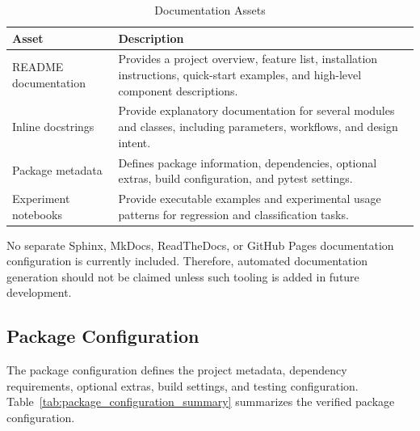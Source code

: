 \begin{table}[H]
      \centering
      \caption{Documentation Assets}
      \label{tab:documentation_assets}
      \renewcommand{\arraystretch}{1.2}
      \begin{tabularx}{\textwidth}{
                  >{\raggedright\arraybackslash}p{3.8cm}
                  >{\raggedright\arraybackslash}X
            }
            \toprule
            \textbf{Asset}       & \textbf{Description}                                                                                        \\
            \midrule
            README documentation &
            Provides a project overview, feature list, installation instructions, quick-start examples, and high-level component descriptions. \\

            Inline docstrings    &
            Provide explanatory documentation for several modules and classes, including parameters, workflows, and design intent.             \\

            Package metadata     &
            Defines package information, dependencies, optional extras, build configuration, and pytest settings.                              \\

            Experiment notebooks &
            Provide executable examples and experimental usage patterns for regression and classification tasks.                               \\
            \bottomrule
      \end{tabularx}
\end{table}

No separate Sphinx, MkDocs, ReadTheDocs, or GitHub Pages documentation configuration is currently included. Therefore, automated documentation generation should not be claimed unless such tooling is added in future development.

\subsection{Package Configuration}

\hs The package configuration defines the project metadata, dependency requirements, optional extras, build settings, and testing configuration. Table~\ref{tab:package_configuration_summary} summarizes the verified package configuration.

